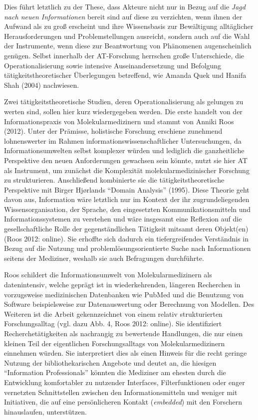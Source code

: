 \documentclass[a4paper,
fontsize=11pt,
oneside,
numbers=noperiodatend,
parskip=half-,
bibliography=totoc,
final
]{scrartcl}
\begin{document}
Dies führt letztlich zu der These, dass Akteure nicht nur in Bezug auf
die \emph{Jagd nach neuen Informationen} bereit sind auf diese zu
verzichten, wenn ihnen der Aufwand als zu groß erscheint und ihre
Wissensbasis zur Bewältigung alltäglicher Herausforderungen und
Problemstellungen ausreicht, sondern auch auf die Wahl der Instrumente,
wenn diese zur Beantwortung von Phänomenen augenscheinlich genügen.
Selbst innerhalb der AT-Forschung herrschen große Unterschiede, die
Operationalisierung sowie intensive Auseinandersetzung und Befolgung
tätigkeitstheoretischer Überlegungen betreffend, wie Amanda Quek und
Hanifa Shah (2004) nachwiesen.

Zwei tätigkeitstheoretische Studien, deren Operationalisierung als
gelungen zu werten sind, sollen hier kurz wiedergegeben werden. Die
erste handelt von der Informationspraxis von Molekularmedizinern und
stammt von Anniki Roos (2012). Unter der Prämisse, holistische Forschung
erschiene zunehmend lohnenswerter im Rahmen
informationswissenschaftlicher Untersuchungen, da Informationsumwelten
selbst komplexer würden und lediglich die ganzheitliche Perspektive den
neuen Anforderungen gewachsen sein könnte, nutzt sie hier AT als
Instrument, um zunächst die Komplexität molekularmedizinischer Forschung
zu strukturieren. Anschließend kombinierte sie die
tätigkeitstheoretische Perspektive mit Birger Hjørlands \enquote{Domain
Analysis} (1995). Diese Theorie geht davon aus, Information wäre
letztlich nur im Kontext der ihr zugrundeliegenden Wissensorganisation,
der Sprache, den eingesetzten Kommunikationsmitteln und
Informationssystemen zu verstehen und wäre insgesamt eine Reflexion auf
die gesellschaftliche Rolle der gegenständlichen Tätigkeit mitsamt deren
Objekt(en) (Roos 2012: online). Sie erhoffte sich dadurch ein
tiefergreifendes Verständnis in Bezug auf die Nutzung und
problemlösungsorientierte Suche nach Informationen seitens der
Mediziner, weshalb sie auch Befragungen durchführte.

Roos schildert die Informationsumwelt von Molekularmedizinern als
datenintensiv, welche geprägt ist in wiederkehrenden, längeren
Recherchen in vorzugsweise medizinischen Datenbanken wie PubMed und die
Benutzung von Software beispielsweise zur Datenauswertung oder
Berechnung von Modellen. Des Weiteren ist die Arbeit gekennzeichnet von
einem relativ strukturierten Forschungsalltag (vgl. dazu Abb. 4, Roos
2012: online). Sie identifiziert Recherchetätigkeiten als nachrangig zu
bewertende Handlungen, die nur einen kleinen Teil der eigentlichen
Forschungsalltags von Molekularmedizinern einnehmen würden. Sie
interpretiert dies als einen Hinweis für die recht geringe Nutzung der
bibliothekarischen Angebote und deutet an, die hiesigen
\enquote{Information Professionals} könnten die Mediziner am ehesten
durch die Entwicklung komfortabler zu nutzender Interfaces,
Filterfunktionen oder enger vernetzten Schnittstellen zwischen den
Informationsmitteln und weniger mit Initiativen, die auf eine
persönlicheren Kontakt (\emph{embedded}) mit den Forschern hinauslaufen,
unterstützen.
\end{document}
